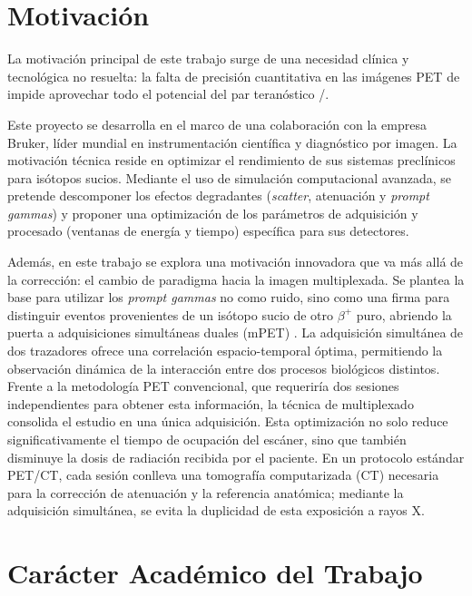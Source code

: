 \section{Motivación}
\label{sec:introduccion:motivacion}

La motivación principal de este trabajo surge de una necesidad clínica y tecnológica no resuelta: la falta de precisión
cuantitativa en las imágenes PET de \yochoseis impide aprovechar todo el potencial del par teranóstico \yochoseis/\ynuevecero.

Este proyecto se desarrolla en el marco de una colaboración con la empresa Bruker, líder mundial en instrumentación científica y
diagnóstico por imagen. La motivación técnica reside en optimizar el rendimiento de sus sistemas preclínicos para isótopos sucios.
Mediante el uso de simulación computacional avanzada, se pretende descomponer los efectos degradantes (\emph{scatter}, atenuación y \emph{prompt gammas})
y proponer una optimización de los parámetros de adquisición y procesado (ventanas de energía y tiempo) específica para sus detectores.

Además, en este trabajo se explora una motivación innovadora que va más allá de la corrección: el cambio de paradigma hacia la imagen multiplexada.
Se plantea la base para utilizar los \emph{prompt gammas} no como ruido, sino como una
firma para distinguir eventos provenientes de un isótopo sucio de otro $\beta^+$ puro, abriendo la puerta a adquisiciones simultáneas duales (mPET) \cite{Pratt2023}.
La adquisición simultánea de dos trazadores ofrece una correlación espacio-temporal óptima, permitiendo la observación dinámica de la interacción entre dos procesos biológicos distintos. Frente a la metodología PET convencional, que requeriría dos sesiones independientes para obtener esta información, la técnica de multiplexado consolida el estudio en una única adquisición. Esta optimización no solo reduce significativamente el tiempo de ocupación del escáner, sino que también disminuye la dosis de radiación recibida por el paciente. En un protocolo estándar PET/CT, cada sesión conlleva una tomografía computarizada (CT) necesaria para la corrección de atenuación y la referencia anatómica; mediante la adquisición simultánea, se evita la duplicidad de esta exposición a rayos X.


\section{Carácter Académico del Trabajo}
\label{sec:introduccion:caracter}

